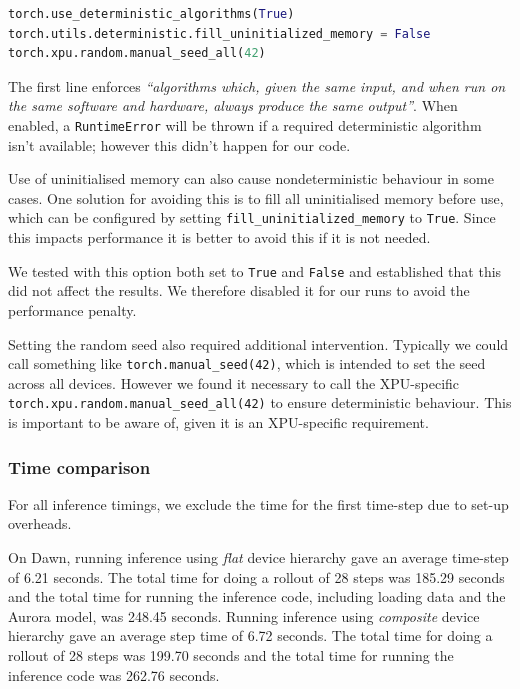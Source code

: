 \begin{lstlisting}[language=Python]
torch.use_deterministic_algorithms(True)
torch.utils.deterministic.fill_uninitialized_memory = False
torch.xpu.random.manual_seed_all(42)
\end{lstlisting}

The first line enforces \textit{``algorithms which, given the same input, and when run on the same software and hardware, always produce the same output''}. When enabled, a {\tt RuntimeError} will be thrown if a required deterministic algorithm isn't available; however this didn't happen for our code.

Use of uninitialised memory can also cause nondeterministic behaviour in some cases. One solution for avoiding this is to fill all uninitialised memory before use, which can be configured by setting {\tt fill\_uninitialized\_memory} to {\tt True}. Since this impacts performance it is better to avoid this if it is not needed.

We tested with this option both set to {\tt True} and {\tt False} and established that this did not affect the results. We therefore disabled it for our runs to avoid the performance penalty.

Setting the random seed also required additional intervention. Typically we could call something like {\tt torch.manual\_seed(42)}, which is intended to set the seed across all devices. However we found it necessary to call the XPU-specific {\tt torch.xpu.random.manual\_seed\_all(42)} to ensure deterministic behaviour. This is important to be aware of, given it is an XPU-specific requirement.

\subsubsection{Time comparison}

For all inference timings, we exclude the time for the first time-step due to set-up overheads.

On Dawn, running inference using \textit{flat} device hierarchy gave an average time-step of 6.21 seconds. The total time for doing a rollout of 28 steps was 185.29 seconds and the total time for running the inference code, including loading data and the Aurora model, was 248.45 seconds. Running inference using \textit{composite} device hierarchy gave an average step time of 6.72 seconds. The total time for doing a rollout of 28 steps was 199.70 seconds and the total time for running the inference code was 262.76 seconds.

